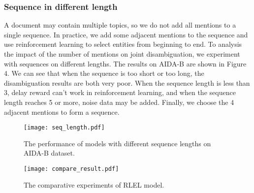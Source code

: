 \documentclass[sigconf]{acmart}
\begin{document}
\subsubsection*{Sequence in different length}
A document may contain multiple topics, so we do not add all mentions to a single sequence. In practice, we add some adjacent mentions to the sequence and use reinforcement learning to select entities from beginning to end. To analysis the impact of the number of mentions on joint disambiguation, we experiment with sequences on different lengths. The results on AIDA-B are shown in Figure 4. We can see that when the sequence is too short or too long, the disambiguation results are both very poor. When the sequence length is less than 3, delay reward can't work in reinforcement learning, and when the sequence length reaches 5 or more, noise data may be added. Finally, we choose the 4 adjacent mentions to form a sequence.

\begin{figure}[t]
\centering
\texttt{[image: seq\_length.pdf]}
\caption{The performance of models with different sequence lengths on AIDA-B dataset.}
\end{figure}

\begin{figure*}[t]
\centering
\texttt{[image: compare\_result.pdf]}
\caption{The comparative experiments of RLEL model.}
\end{figure*}
\end{document}
